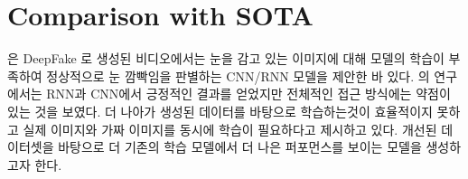 \documentclass{article}
\begin{document}
\section{Comparison with SOTA}

\cite[Yuezen]{yuezeun2018eyeblink}은 DeepFake 로 생성된 비디오에서는 눈을 감고 있는 이미지에 대해 모델의 학습이 부족하여 정상적으로 눈 깜빡임을 판별하는 CNN/RNN 모델을 제안한 바 있다. \cite[David]{DavidDetection}의 연구에서는 RNN과 CNN에서 긍정적인 결과를 얻었지만 전체적인 접근 방식에는 약점이 있는 것을 보였다. 더 나아가 생성된 데이터를 바탕으로 학습하는것이 효율적이지 못하고 실제 이미지와 가짜 이미지를 동시에 학습이 필요하다고 제시하고 있다. 개선된 데이터셋을 바탕으로 더 기존의 학습 모델에서 더 나은 퍼포먼스를 보이는 모델을 생성하고자 한다.






\end{document}
